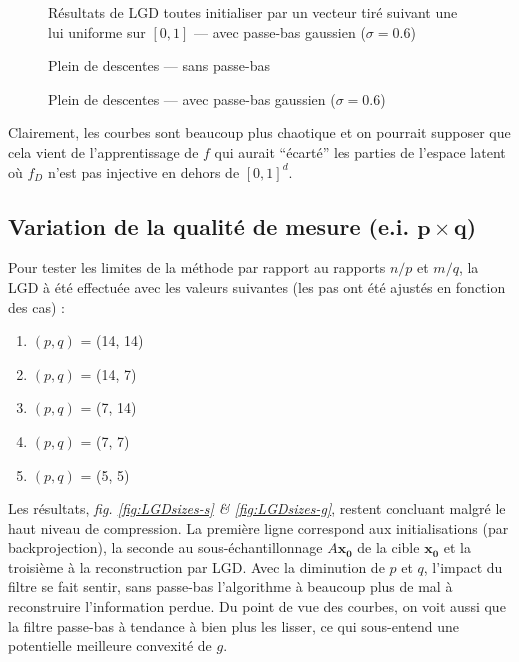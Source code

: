 \documentclass[hidelinks, french]{article} %
\renewcommand{\bf}[1]{\boldsymbol{#1}}
\theoremstyle{enonce}
\theoremstyle{special}
\theoremstyle{rq}
\theoremstyle{exo}
\theoremstyle{demo}
\begin{document}
\begin{figure}[H]\centering
	
	\caption{Résultats de LGD toutes initialiser par un vecteur tiré suivant une lui uniforme sur $[0,1]$ ---  avec passe-bas gaussien ($\sigma=0.6$)}
	\label{fig:LGDunif-g}
\end{figure}
\begin{figure}[H]\centering
	
    \caption{Plein de descentes --- sans passe-bas}
    \label{fig:LGDgauss-s}
\end{figure}
\begin{figure}[H]\centering
	
    \caption{Plein de descentes ---  avec passe-bas gaussien ($\sigma=0.6$)}
    \label{fig:LGDgauss-g}
\end{figure}

\noindent Clairement, les courbes sont beaucoup plus chaotique et on pourrait supposer que cela vient de l'apprentissage de $f$ qui aurait ``écarté'' les parties de l'espace latent où $f_D$ n'est pas injective en dehors de $[0,1]^d$. 
\\


\subsection{Variation de la qualité de mesure (e.i. $\bf{p}\times\bf{q}$)}\label{sec:LGDsize}

Pour tester les limites de la méthode par rapport au rapports $n/p$ et $m/q$, la LGD à été effectuée avec les valeurs suivantes (les pas ont été ajustés en fonction des cas) :
\begin{enumerate}[label=(\arabic*)]
	\item $(p,q)$ = (14, 14)
	\item $(p,q)$ = (14, 7)
	\item $(p,q)$ = (7, 14)
	\item $(p,q)$ = (7, 7)
	\item $(p,q)$ = (5, 5)
\end{enumerate}

Les résultats, \textit{fig. \ref{fig:LGDsizes-s} \& \ref{fig:LGDsizes-g}}, restent concluant malgré le haut niveau de compression. La première ligne correspond aux initialisations (par backprojection), la seconde au sous-échantillonnage $A\bf{x_0}$ de la cible $\bf{x_0}$ et la troisième à la reconstruction par LGD. Avec la diminution de $p$ et $q$, l'impact du filtre se fait sentir, sans passe-bas l'algorithme à beaucoup plus de mal à reconstruire l'information perdue. Du point de vue des courbes, on voit aussi que la filtre passe-bas à tendance à bien plus les lisser, ce qui sous-entend une potentielle meilleure convexité de $g$.
\end{document}
